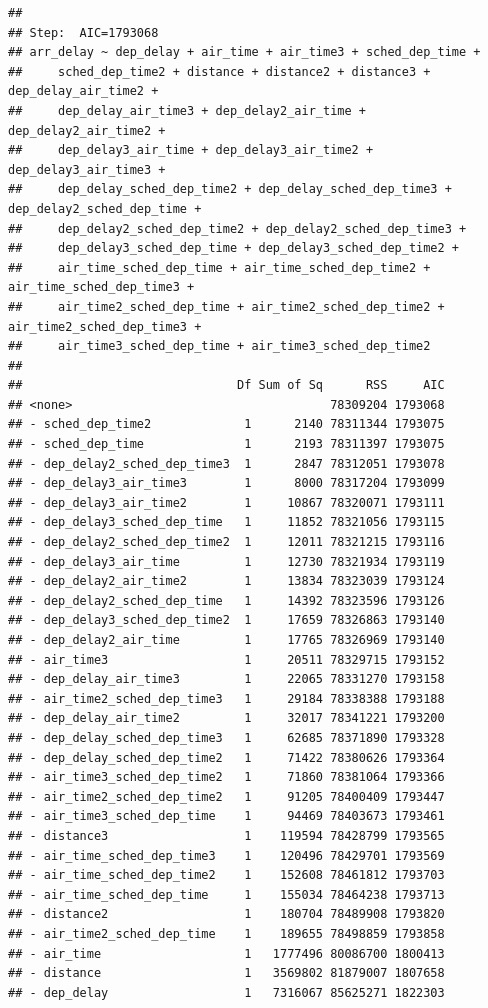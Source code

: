 \documentclass[
]{article}
\begin{document}
\begin{verbatim}
## 
## Step:  AIC=1793068
## arr_delay ~ dep_delay + air_time + air_time3 + sched_dep_time + 
##     sched_dep_time2 + distance + distance2 + distance3 + dep_delay_air_time2 + 
##     dep_delay_air_time3 + dep_delay2_air_time + dep_delay2_air_time2 + 
##     dep_delay3_air_time + dep_delay3_air_time2 + dep_delay3_air_time3 + 
##     dep_delay_sched_dep_time2 + dep_delay_sched_dep_time3 + dep_delay2_sched_dep_time + 
##     dep_delay2_sched_dep_time2 + dep_delay2_sched_dep_time3 + 
##     dep_delay3_sched_dep_time + dep_delay3_sched_dep_time2 + 
##     air_time_sched_dep_time + air_time_sched_dep_time2 + air_time_sched_dep_time3 + 
##     air_time2_sched_dep_time + air_time2_sched_dep_time2 + air_time2_sched_dep_time3 + 
##     air_time3_sched_dep_time + air_time3_sched_dep_time2
## 
##                              Df Sum of Sq      RSS     AIC
## <none>                                    78309204 1793068
## - sched_dep_time2             1      2140 78311344 1793075
## - sched_dep_time              1      2193 78311397 1793075
## - dep_delay2_sched_dep_time3  1      2847 78312051 1793078
## - dep_delay3_air_time3        1      8000 78317204 1793099
## - dep_delay3_air_time2        1     10867 78320071 1793111
## - dep_delay3_sched_dep_time   1     11852 78321056 1793115
## - dep_delay2_sched_dep_time2  1     12011 78321215 1793116
## - dep_delay3_air_time         1     12730 78321934 1793119
## - dep_delay2_air_time2        1     13834 78323039 1793124
## - dep_delay2_sched_dep_time   1     14392 78323596 1793126
## - dep_delay3_sched_dep_time2  1     17659 78326863 1793140
## - dep_delay2_air_time         1     17765 78326969 1793140
## - air_time3                   1     20511 78329715 1793152
## - dep_delay_air_time3         1     22065 78331270 1793158
## - air_time2_sched_dep_time3   1     29184 78338388 1793188
## - dep_delay_air_time2         1     32017 78341221 1793200
## - dep_delay_sched_dep_time3   1     62685 78371890 1793328
## - dep_delay_sched_dep_time2   1     71422 78380626 1793364
## - air_time3_sched_dep_time2   1     71860 78381064 1793366
## - air_time2_sched_dep_time2   1     91205 78400409 1793447
## - air_time3_sched_dep_time    1     94469 78403673 1793461
## - distance3                   1    119594 78428799 1793565
## - air_time_sched_dep_time3    1    120496 78429701 1793569
## - air_time_sched_dep_time2    1    152608 78461812 1793703
## - air_time_sched_dep_time     1    155034 78464238 1793713
## - distance2                   1    180704 78489908 1793820
## - air_time2_sched_dep_time    1    189655 78498859 1793858
## - air_time                    1   1777496 80086700 1800413
## - distance                    1   3569802 81879007 1807658
## - dep_delay                   1   7316067 85625271 1822303
\end{verbatim}
\end{document}
